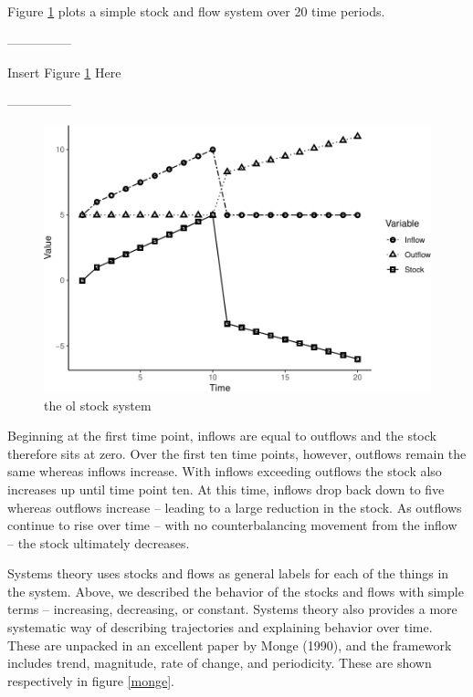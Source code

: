 \documentclass[english,,man]{apa6}
\theoremstyle{definition}
\theoremstyle{definition}
\theoremstyle{definition}
\theoremstyle{remark}
\begin{document}
Figure \ref{stocks} plots a simple stock and flow system over 20 time
periods.

\begin{center}

---------------

Insert Figure \ref{stocks} Here

---------------

\end{center}

\begin{figure}
\centering
\includegraphics{figs/unnamed-chunk-9-1.pdf}
\caption{\label{fig:unnamed-chunk-9}the ol stock system\label{stocks}}
\end{figure}

\noindent Beginning at the first time point, inflows are equal to
outflows and the stock therefore sits at zero. Over the first ten time
points, however, outflows remain the same whereas inflows increase. With
inflows exceeding outflows the stock also increases up until time point
ten. At this time, inflows drop back down to five whereas outflows
increase -- leading to a large reduction in the stock. As outflows
continue to rise over time -- with no counterbalancing movement from the
inflow -- the stock ultimately decreases.

Systems theory uses stocks and flows as general labels for each of the
things in the system. Above, we described the behavior of the stocks and
flows with simple terms -- increasing, decreasing, or constant. Systems
theory also provides a more systematic way of describing trajectories
and explaining behavior over time. These are unpacked in an excellent
paper by Monge (1990), and the framework includes trend, magnitude, rate
of change, and periodicity. These are shown respectively in figure
\ref{monge}.
\end{document}
